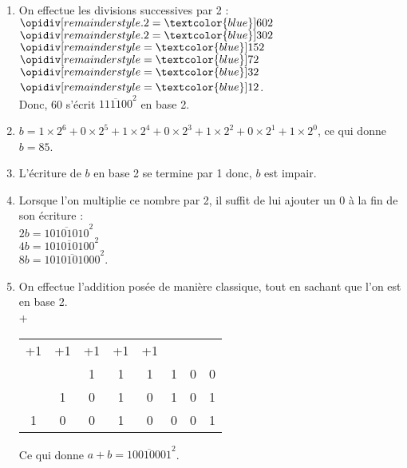 \ \\ [-5mm]
   \begin{enumerate}
      \item On effectue les divisions successives par 2 : \\ [1mm]
      $\opidiv[remainderstyle.2=\textcolor{blue}]{60}{2}$ \quad $\opidiv[remainderstyle.2=\textcolor{blue}]{30}{2}$ \quad $\opidiv[remainderstyle=\textcolor{blue}]{15}{2}$ \quad $\opidiv[remainderstyle=\textcolor{blue}]{7}{2}$ \quad $\opidiv[remainderstyle=\textcolor{blue}]{3}{2}$ \quad $\opidiv[remainderstyle=\textcolor{blue}]{1}{2}$. \\ [1mm]
         Donc, 60 s'écrit {\blue $\overline{111100}^2$} en base 2. \\
      \item $b =1\times2^6+0\times2^5+1\times2^4+0\times2^3+1\times2^2+0\times2^1+1\times2^0$, ce qui donne {\blue $b = 85$}.
      \item L'écriture de $b$ en base 2 se termine par 1 donc, {\blue $b$ est impair}.
      \item Lorsque l'on multiplie ce nombre par 2, il suffit de lui ajouter un 0 à la fin de son écriture : \\
         {\blue $2b =\overline{10101010}^2$} \\
         {\blue $4b =\overline{101010100}^2$} \\
         {\blue $8b =\overline{1010101000}^2$}.
       \item On effectue l'addition posée de manière classique, tout en sachant que l'on est en base 2. \\ \hspace*{1cm} +\begin{tabular}{cccccccc}
            \tiny +1 & \tiny +1 & \tiny +1 & \tiny +1 & \tiny +1 & & & \\
            & & 1 & 1 & 1 & 1 & 0 & 0 \\
            & 1 & 0 & 1 & 0 & 1 & 0 & 1 \\
            \hline
            1 & 0 & 0 & 1 & 0 & 0 & 0 & 1 \\
         \end{tabular}
   \qquad Ce qui donne {\blue $a+b =\overline{10010001}^2$}.
   \end{enumerate}
